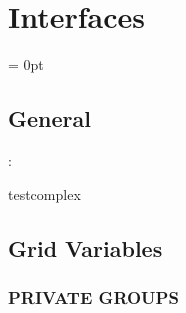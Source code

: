 
\section{Interfaces} 


\parskip = 0pt

\vspace{3mm} \subsection*{General}

: 

testcomplex
\vspace{2mm}
\subsection*{Grid Variables}
\vspace{5mm}\subsubsection{PRIVATE GROUPS}

\vspace{5mm}

